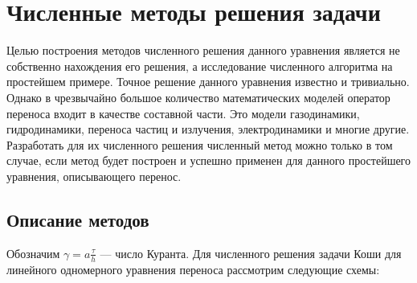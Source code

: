 \documentclass[12pt, a4paper]{article}
\begin{document}
\section{Численные методы решения задачи}
Целью построения методов численного решения данного уравнения является не собственно нахождения его решения, а исследование численного алгоритма на простейшем примере. Точное решение данного уравнения известно и тривиально. Однако в чрезвычайно большое количество математических моделей оператор переноса входит в качестве составной части. Это модели газодинамики, гидродинамики, переноса частиц и излучения, электродинамики и многие другие. Разработать для их численного решения численный метод можно только в том случае, если метод будет построен и успешно применен для данного простейшего уравнения, описывающего перенос.
\subsection{Описание методов}
Обозначим $\gamma = a \frac{\tau}{h}$ --- число Куранта. Для численного решения задачи Коши для линейного одномерного уравнения переноса рассмотрим следующие схемы:
\end{document}
